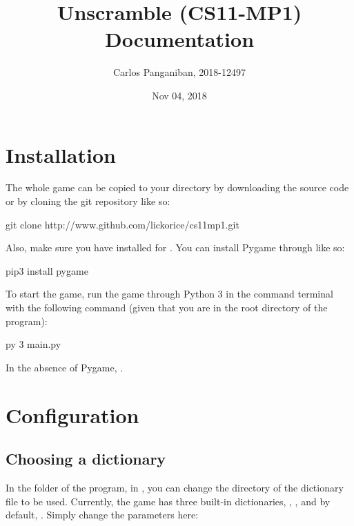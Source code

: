 \documentclass[letterpaper,10pt,english,openany,oneside]{sphinxmanual}
\title{Unscramble (CS11-MP1) Documentation}
\date{Nov 04, 2018}
\author{Carlos Panganiban, 2018-12497}
\begin{document}
\pagestyle{empty}
\maketitle
\pagestyle{plain}
\sphinxtableofcontents
\pagestyle{normal}
\label{\detokenize{index::doc}}



\chapter{Installation}
\label{\detokenize{index:installation}}
The whole game can be copied to your directory
by downloading the source code  or by cloning
the git repository like so:

%
\begin{sphinxVerbatim}[commandchars=\\\{\}]
git clone http://www.github.com/lickorice/cs11\PYGZhy{}mp1.git
\end{sphinxVerbatim}

Also, make sure you have  installed for .
You can install Pygame through  like so:

%
\begin{sphinxVerbatim}[commandchars=\\\{\}]
pip3 install pygame
\end{sphinxVerbatim}

To start the game, run the game through Python 3 in the command terminal
with the following command (given that you are in the root directory of the
program):

%
\begin{sphinxVerbatim}[commandchars=\\\{\}]
py \PYGZhy{}3 main.py
\end{sphinxVerbatim}

In the absence of Pygame, .


\chapter{Configuration}
\label{\detokenize{index:configuration}}

\section{Choosing a dictionary}
\label{\detokenize{index:choosing-a-dictionary}}
In the  folder of the program, in , you can change the directory of the
dictionary file to be used. Currently, the game has three built-in dictionaries, ,
, and by default, . Simply change the parameters here:
\end{document}

